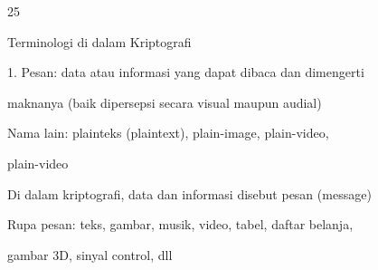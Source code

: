 \documentclass{article}
\begin{document}

25

Terminologi di dalam Kriptografi

1. Pesan: data atau informasi yang dapat dibaca dan dimengerti 

maknanya (baik dipersepsi secara visual maupun audial)

     Nama lain: plainteks (plaintext), plain-image, plain-video,



     plain-video 

      Di dalam kriptografi, data dan informasi disebut pesan (message)


      Rupa pesan:  teks, gambar, musik,  video, tabel, daftar belanja, 

                             gambar 3D, sinyal control, dll
\end{document}
